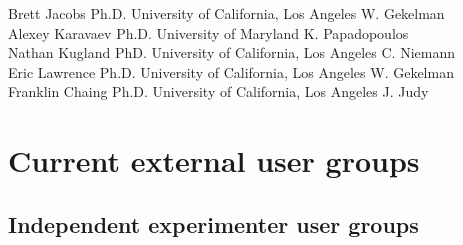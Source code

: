 \documentclass[11pt]{article}
\begin{document}
\begin{tabbing}
Brett Jacobs \> Ph.D. \>  University of California, Los Angeles \> W. Gekelman \\
Alexey Karavaev \> Ph.D. \>  University of Maryland \> K. Papadopoulos \\
Nathan Kugland \> PhD. \> University of California, Los Angeles \> C. Niemann \\
Eric Lawrence \> Ph.D. \>  University of California, Los Angeles \>
W. Gekelman \\
Franklin Chaing \> Ph.D. \> University of California, Los Angeles \>
J. Judy
 \\
 \end{tabbing}
 
\section{Current  external user groups}



\subsection{Independent experimenter user groups}
\end{document}
